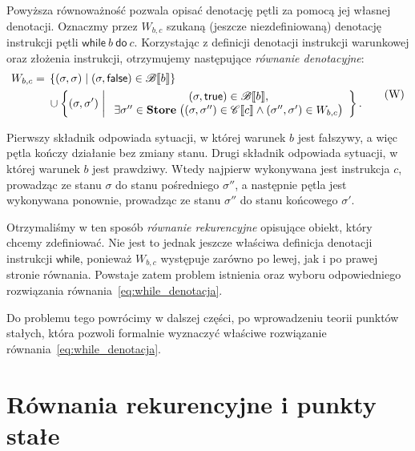 \documentclass[11pt,a4paper]{article}
\theoremstyle{definition}
\theoremstyle{plain}
\DeclarePairedDelimiter{\semdelim}{\llbracket}{\rrbracket}
\newcommand{\sem}[1]{\semdelim{#1}}
\newcommand{\Cc}{\mathscr{C}}   %
\newcommand{\Bb}{\mathscr{B}}   %
\newcommand{\Store}{\textbf{Store}}
\newcommand{\kw}[1]{\ensuremath{\mathsf{#1}}} %
\begin{document}
Powyższa równoważność pozwala opisać denotację pętli za pomocą jej
własnej denotacji. Oznaczmy przez $W_{b,c}$ szukaną (jeszcze
niezdefiniowaną) denotację instrukcji pętli
$\kw{while}\ b\ \kw{do}\ c$. Korzystając z definicji denotacji
instrukcji warunkowej oraz złożenia instrukcji, otrzymujemy następujące
\emph{równanie denotacyjne}:
\begin{equation}
	\label{eq:while_denotacja}
	\begin{aligned}
		W_{b,c}
		={}&
		\left\{
		(\sigma,\sigma)
		\;\middle|\;
		(\sigma,\kw{false})\in\Bb\sem{b}
		\right\}\\
		&{}\cup
		\left\{
		(\sigma,\sigma')
		\;\middle|\;
		\begin{array}{c}
			(\sigma,\kw{true})\in\Bb\sem{b},\\
			\exists\sigma''\in\Store\;
			\big(
			(\sigma,\sigma'')\in\Cc\sem{c}
			\land
			(\sigma'',\sigma')\in W_{b,c}
			\big)
		\end{array}
		\right\}.
	\end{aligned}
	\tag{W}
\end{equation}

Pierwszy składnik odpowiada sytuacji, w której warunek $b$ jest fałszywy,
a więc pętla kończy działanie bez zmiany stanu. Drugi składnik odpowiada
sytuacji, w której warunek $b$ jest prawdziwy. Wtedy najpierw wykonywana jest
instrukcja $c$, prowadząc ze stanu $\sigma$ do stanu pośredniego
$\sigma''$, a następnie pętla jest wykonywana ponownie, prowadząc ze
stanu $\sigma''$ do stanu końcowego $\sigma'$.

Otrzymaliśmy w ten sposób \emph{równanie rekurencyjne} opisujące obiekt,
który chcemy zdefiniować. Nie jest to jednak jeszcze właściwa definicja
denotacji instrukcji \kw{while}, ponieważ $W_{b,c}$ występuje zarówno
po lewej, jak i po prawej stronie równania. Powstaje zatem problem
istnienia oraz wyboru odpowiedniego rozwiązania równania~\eqref{eq:while_denotacja}.

Do problemu tego powrócimy w dalszej części, po wprowadzeniu teorii punktów
stałych, która pozwoli formalnie wyznaczyć właściwe rozwiązanie równania~\eqref{eq:while_denotacja}.

\section{Równania rekurencyjne i punkty stałe}
\end{document}

